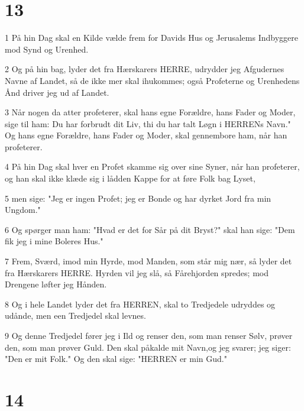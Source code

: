 \chapter{13}

\par 1 På hin Dag skal en Kilde vælde frem for Davids Hus og Jerusalems Indbyggere mod Synd og Urenhed.
\par 2 Og på hin bag, lyder det fra Hærskarers HERRE, udrydder jeg Afgudernes Navne af Landet, så de ikke mer skal ihukommes; også Profeterne og Urenhedens Ånd driver jeg ud af Landet.
\par 3 Når nogen da atter profeterer, skal hans egne Forældre, hans Fader og Moder, sige til ham: Du har forbrudt dit Liv, thi du har talt Løgn i HERRENs Navn." Og hans egne Forældre, hans Fader og Moder, skal gennembore ham, når han profeterer.
\par 4 På hin Dag skal hver en Profet skamme sig over sine Syner, når han profeterer, og han skal ikke klæde sig i lådden Kappe for at føre Folk bag Lyset,
\par 5 men sige: "Jeg er ingen Profet; jeg er Bonde og har dyrket Jord fra min Ungdom."
\par 6 Og spørger man ham: "Hvad er det for Sår på dit Bryst?" skal han sige: "Dem fik jeg i mine Boleres Hus."
\par 7 Frem, Sværd, imod min Hyrde, mod Manden, som står mig nær, så lyder det fra Hærskarers HERRE. Hyrden vil jeg slå, så Fårehjorden spredes; mod Drengene løfter jeg Hånden.
\par 8 Og i hele Landet lyder det fra HERREN, skal to Tredjedele udryddes og udånde, men een Tredjedel skal levnes.
\par 9 Og denne Tredjedel fører jeg i Ild og renser den, som man renser Sølv, prøver den, som man prøver Guld. Den skal påkalde mit Navn,og jeg svarer; jeg siger: "Den er mit Folk." Og den skal sige: "HERREN er min Gud."

\chapter{14}

